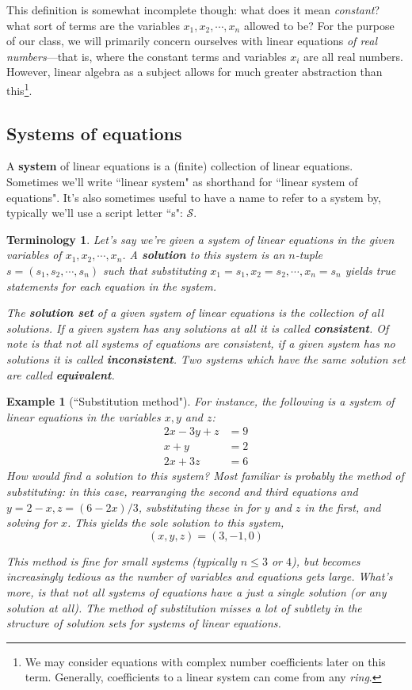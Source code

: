 \documentclass[12pt]{article}
\numberwithin{equation}{subsection}
\numberwithin{figure}{subsection}
\theoremstyle{note}
\newtheorem{example}[subsection]{Example}
\newtheorem{terminology}[subsection]{Terminology}
\begin{document}
This definition is somewhat incomplete though: what does it mean \textit{constant}? what sort of terms are the variables $x_1,x_2,\cdots,x_n$ allowed to be? For the purpose of our class, we will primarily concern ourselves with linear equations \textit{of real numbers}---that is, where the constant terms and variables $x_i$ are all real numbers. However, linear algebra as a subject allows for much greater abstraction than this\footnote{We may consider equations with complex number coefficients later on this term. Generally, coefficients to a linear system can come from any \textit{ring}.}. 

\subsection{Systems of equations} 
A \textbf{system} of linear equations is  a (finite) collection of linear equations. Sometimes we'll write ``linear system" as shorthand for ``linear system of equations". It's also sometimes useful to have a name to refer to a system by, typically we'll use a script letter ``s": $\mathcal{S}$. 

\begin{terminology} Let's say we're given a system of linear equations in the given variables of $x_1,x_2,\cdots,x_n$. A \textbf{solution} to this system is an $n$-tuple $s=(s_1,s_2,\cdots,s_n)$ such that substituting $x_1=s_1, x_2=s_2, \cdots, x_n=s_n$ yields true statements for each equation in the system. 
 
The \textbf{solution set} of a given system of linear equations is the collection of all solutions. If a given system has any solutions at all it is called \textbf{consistent}. Of note is that not all systems of equations are consistent, if a given system has no solutions it is called \textbf{inconsistent}. Two systems which have the same solution set are called \textbf{equivalent}.
\end{terminology}

\begin{example}[``Substitution method"]
For instance, the following is a system of linear equations in the variables $x,y$ and $z$: 
\begin{align}
	2x - 3y+z &= 9 \nonumber \\
	x+y&=2 \nonumber \\
	2x+3z &=6 \label{ex-sub}
\end{align}
How would find a solution to this system? Most familiar is probably the method of substituting: in this case, rearranging the second and third equations and $y=2-x, z=(6-2x)/3$, substituting these in for $y$ and $z$ in the first, and solving for $x$. This yields the sole solution to this system, \[(x,y,z)=(3,-1,0)\]

This method is fine for small systems (typically $n\leq 3$ or $4$), but becomes increasingly tedious as the number of variables and equations gets large. What's more, is that not all systems of equations have a just a single solution (or any solution at all). The method of substitution misses a lot of subtlety in the \textit{structure} of solution sets for systems of linear equations. 
\end{example}
\end{document}

